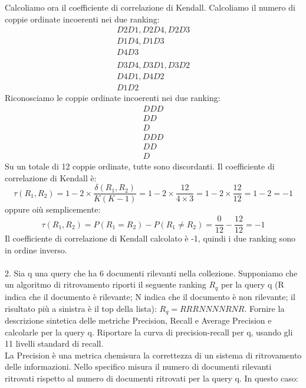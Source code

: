 \documentclass{report}
\begin{document}
	Calcoliamo ora il coefficiente di correlazione di Kendall. Calcoliamo il numero di coppie ordinate incoerenti nei due ranking:
	\[
		\begin{array}{l}
			D2D1, D2D4, D2D3\\
			D1D4, D1D3\\
			D4D3\\
		\end{array}
	\]
	\[
		\begin{array}{l}
			D3D4, D3D1, D3D2\\
			D4D1, D4D2\\
			D1D2
		\end{array}
	\]
	Riconosciamo le coppie ordinate incoerenti nei due ranking:
	\[
		\begin{array}{l}
			D D D\\
			D D\\
			D
		\end{array}
	\]
	\[
		\begin{array}{l}
			D D D\\
			D D\\
			D
		\end{array}
	\]
	Su un totale di 12 coppie ordinate, tutte sono discordanti. Il coefficiente di correlazione di Kendall è:
	\[
		\tau(R_1, R_2) = 1 - 2 \times \frac{\delta(R_1, R_2)}{K(K-1)} = 1 - 2 \times \frac{12}{4 \times 3} = 1 - 2 \times \frac{12}{12} = 1 - 2 = -1
	\]
	oppure oiù semplicemente:
	\[
		\tau(R_1, R_2) = P(R_1 = R_2) - P(R_1 \neq R_2) = \frac{0}{12} - \frac{12}{12} = -1
	\] 
	Il coefficiente di correlazione di Kendall calcolato è -1, quindi i due ranking sono in ordine inverso.
	\vspace{\baselineskip}\\
	\vspace{\baselineskip}\\
	2. Sia q una query che ha 6 documenti rilevanti nella collezione. Supponiamo che un algoritmo di ritrovamento riporti il seguente ranking $R_q$ per la query q (R indica che il documento è rilevante; N indica che il documento è non rilevante; il risultato più a sinistra è il top della lista): $R_q = RRRNNNNRNR$. Fornire la descrizione sintetica delle metriche Precision, Recall e Average Precision e calcolarle per la query q. Riportare la curva di precision-recall per q, usando gli 11 livelli standard di recall.
	\vspace{\baselineskip}\\
	La Precision è una metrica chemisura la correttezza di un sistema di ritrovamento delle informazioni. Nello specifico misura il numero di documenti rilevanti ritrovati rispetto al numero di documenti ritrovati per la query q. In questo caso:
\end{document}
